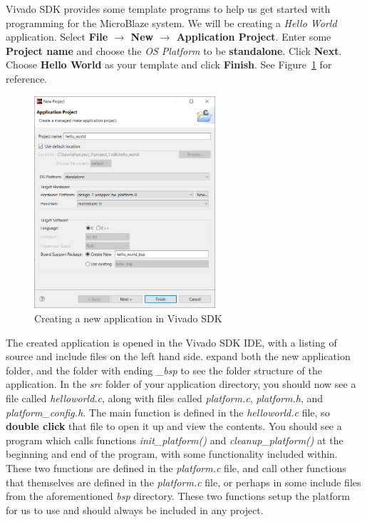 \documentclass[11pt]{article}
\begin{document}
Vivado SDK provides some template programs to help us get started with programming for the MicroBlaze system. We will be creating a \textit{Hello World} application. Select \textbf{File $\rightarrow$ New $\rightarrow$ Application Project}. Enter some \textbf{Project name} and choose the \textit{OS Platform} to be \textbf{standalone}. Click \textbf{Next}. Choose \textbf{Hello World} as your template and click \textbf{Finish}. See Figure~\ref{fig:new_app_hello} for reference.

\begin{figure}[!h]
    \centering
    \includegraphics[width=0.60\textwidth]{images/new_app_hello.png}
    \caption{Creating a new application in Vivado SDK}
    \label{fig:new_app_hello}
\end{figure}

\newpage
The created application is opened in the Vivado SDK IDE, with a listing of source and include files on the left hand side. expand both the new application folder, and the folder with ending \textit{\_bsp} to see the folder structure of the application. In the \textit{src} folder of your application directory, you should now see a file called \textit{helloworld.c}, along with files called \textit{platform.c}, \textit{platform.h}, and \textit{platform\_config.h}. The main function is defined in the \textit{helloworld.c} file, so \textbf{double click} that file to open it up and view the contents. You should see a program which calls functions \textit{init\_platform()} and \textit{cleanup\_platform()} at the beginning and end of the program, with some functionality included within. These two functions are defined in the \textit{platform.c} file, and call other functions that themselves are defined in the \textit{platform.c} file, or perhaps in some include files from the aforementioned \textit{bsp} directory. These two functions setup the platform for us to use and should always be included in any project.
\end{document}
